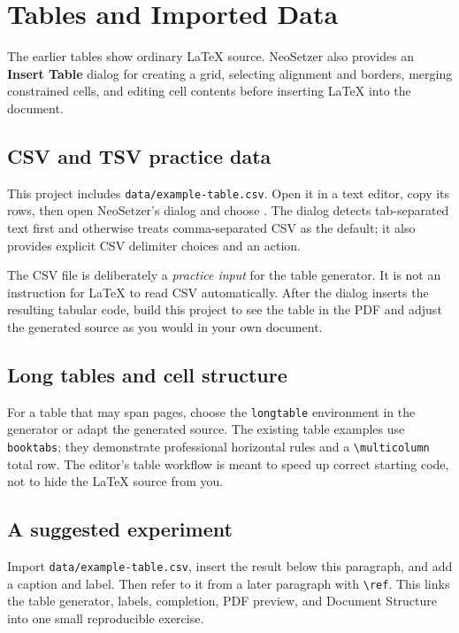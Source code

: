 
\section{Tables and Imported Data}
\label{sec:tables-data}

The earlier tables show ordinary LaTeX source. NeoSetzer also provides an
\textbf{Insert Table} dialog for creating a grid, selecting alignment and
borders, merging constrained cells, and editing cell contents before inserting
LaTeX into the document.

\subsection{CSV and TSV practice data}
\label{sec:tables-data:csv}

This project includes \texttt{data/example-table.csv}. Open it in a text
editor, copy its rows, then open NeoSetzer's  dialog and
choose . The dialog detects tab-separated text first and
otherwise treats comma-separated CSV as the default; it also provides explicit
CSV delimiter choices and an  action.

The CSV file is deliberately a \emph{practice input} for the table generator.
It is not an instruction for LaTeX to read CSV automatically. After the dialog
inserts the resulting tabular code, build this project to see the table in the
PDF and adjust the generated source as you would in your own document.

\subsection{Long tables and cell structure}
\label{sec:tables-data:longtable}

For a table that may span pages, choose the \texttt{longtable} environment in
the generator or adapt the generated source. The existing table examples use
\texttt{booktabs}; they demonstrate professional horizontal rules and a
\texttt{\textbackslash multicolumn} total row. The editor's table workflow is
meant to speed up correct starting code, not to hide the LaTeX source from you.

\subsection{A suggested experiment}
\label{sec:tables-data:experiment}

Import \texttt{data/example-table.csv}, insert the result below this paragraph,
and add a caption and label. Then refer to it from a later paragraph with
\texttt{\textbackslash ref}. This links the table generator, labels,
completion, PDF preview, and Document Structure into one small reproducible
exercise.
